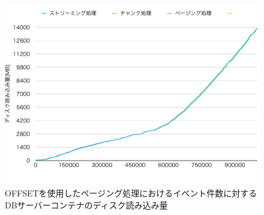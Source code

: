 \documentclass[../../../../../main]{subfiles}
\begin{document}
    \begin{figure}[H]
        \centering
        \includegraphics[width=12cm]{graph}
        \caption{OFFSETを使用したページング処理におけるイベント件数に対するDBサーバーコンテナのディスク読み込み量}
        \label{fig:each-way-db-disk-out-app_1_1024-db_1_1024}
    \end{figure}
\end{document}
